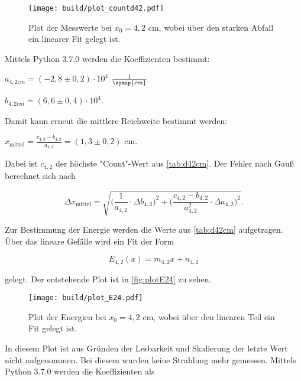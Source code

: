 

\begin{figure}
    \centering
    \texttt{[image: build/plot\_countd42.pdf]}
    \caption{Plot der Messwerte bei $x_0 = 4,2$ cm, wobei über den starken Abfall ein linearer Fit gelegt ist.}
    \label{fig:plot42}
\end{figure}

Mittels Python 3.7.0 werden die Koeffizienten bestimmt:

\begin{center}
    $a_{4,2cm} = (-2,8 \pm 0,2) \cdot 10^{4}$ $\frac{1}{\symup{cm}}$

    $b_{4,2cm} = (6,6 \pm 0,4) \cdot 10^{4}$.
\end{center}

Damit kann erneut die mittlere Reichweite bestimmt werden:

\begin{center}
    $x_\text{mittel} = \frac{c_{4,2} - b_{4,2}}{a_{4,2}} = (1,3 \pm 0,2)$ cm.
\end{center}

Dabei ist $c_{4,2}$ der höchste "Count"-Wert aus \autoref{tab:d42cm}. Der Fehler nach  Gauß berechnet sich nach

\begin{equation}
    \Delta x_\text{mittel} = \sqrt{\bigg(\frac{1}{a_{4,2}} \cdot \Delta b_{4,2} \bigg)^2 + \bigg( \frac{c_{4,2}-b_{4,2}}{a_{4,2}^2} \cdot \Delta a_{4,2} \bigg)^2}.
\end{equation}

Zur Bestimmung der Energie werden die Werte aus \autoref{tab:d42cm} aufgetragen. Über das lineare Gefälle wird ein Fit der Form

\begin{equation}
    E_{4,2}(x) = m_{4,2} x + n_{4,2}
\end{equation}

gelegt. Der entstehende Plot ist in \autoref{fig:plotE24} zu sehen.

\begin{figure}
    \centering
    \texttt{[image: build/plot\_E24.pdf]}
    \caption{Plot der Energien bei $x_0 = 4,2$ cm, wobei über den linearen Teil ein Fit gelegt ist.}
    \label{fig:plotE24}
\end{figure}

In diesem Plot ist aus Gründen der Lesbarkeit und Skalierung der letzte Wert nicht aufgenommen. Bei diesem wurden keine Strahlung mehr gemessen.
Mittels Python 3.7.0 werden die Koeffizienten als

